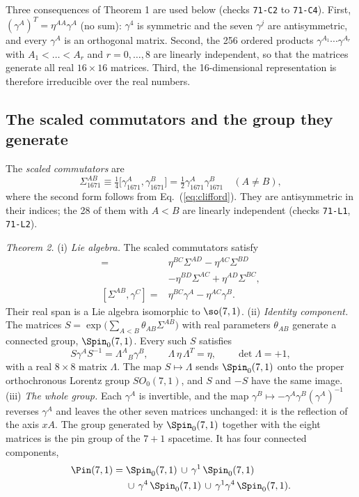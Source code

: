 Three consequences of Theorem 1 are used below (checks \texttt{71-C2} to \texttt{71-C4}). First,
$(\gamma^A)^T=\eta^{AA}\gamma^A$ (no sum): $\gamma^4$ is symmetric and the seven $\gamma^j$ are
antisymmetric, and every $\gamma^A$ is an orthogonal matrix. Second, the 256 ordered products
$\gamma^{A_1}\cdots\gamma^{A_r}$ with $A_1<\dots<A_r$ and $r=0,\dots,8$ are linearly independent, so
that the matrices generate all real $16\times16$ matrices. Third, the 16-dimensional representation is
therefore irreducible over the real numbers.

\subsection{The scaled commutators and the group they generate}
\label{sec:pin}

The \emph{scaled commutators} are
\begin{equation}
\Sigma_{1671}^{AB}\equiv\tfrac14\big[\gamma_{1671}^A,\gamma_{1671}^B\big]
=\tfrac12\gamma_{1671}^A\gamma_{1671}^B\quad(A\neq B),
\label{eq:Sigma}
\end{equation}
where the second form follows from Eq.~(\ref{eq:clifford}). They are antisymmetric in their indices;
the 28 of them with $A<B$ are linearly independent (checks \texttt{71-L1}, \texttt{71-L2}).

\emph{Theorem 2.} (i) \emph{Lie algebra.} The scaled commutators satisfy
\begin{align}
[\Sigma^{AB},\Sigma^{CD}]={}&\eta^{BC}\Sigma^{AD}-\eta^{AC}\Sigma^{BD}\nonumber\\
&-\eta^{BD}\Sigma^{AC}+\eta^{AD}\Sigma^{BC},\label{eq:so44}\\
[\Sigma^{AB},\gamma^{C}]={}&\eta^{BC}\gamma^{A}-\eta^{AC}\gamma^{B}.\label{eq:vector}
\end{align}
Their real span is a Lie algebra isomorphic to $\so(7,1)$. (ii) \emph{Identity component.} The
matrices $S=\exp\big(\sum_{A<B}\theta_{AB}\Sigma^{AB}\big)$ with real parameters $\theta_{AB}$ generate
a connected group, $\Spin_0(7,1)$. Every such $S$ satisfies
\begin{equation}
S\gamma^AS^{-1}=\Lambda^A{}_B\gamma^B,\qquad\Lambda\,\eta\,\Lambda^T=\eta,\qquad\det\Lambda=+1,
\label{eq:lambda}
\end{equation}
with a real $8\times8$ matrix $\Lambda$. The map $S\mapsto\Lambda$ sends $\Spin_0(7,1)$ onto the
proper orthochronous Lorentz group $SO_0(7,1)$, and $S$ and $-S$ have the same image. (iii)
\emph{The whole group.} Each $\gamma^A$ is invertible, and the map
$\gamma^B\mapsto-\gamma^A\gamma^B(\gamma^A)^{-1}$ reverses $\gamma^A$ and leaves the other seven
matrices unchanged: it is the reflection of the axis $xA$. The group generated by $\Spin_0(7,1)$
together with the eight matrices is the pin group of the $7+1$ spacetime. It has four connected
components,
\begin{align}
\Pin(7,1)={}&\Spin_0(7,1)\,\cup\,\gamma^1\,\Spin_0(7,1)\nonumber\\
&\cup\,\gamma^4\,\Spin_0(7,1)\,\cup\,\gamma^1\gamma^4\,\Spin_0(7,1).
\label{eq:pin44}
\end{align}

